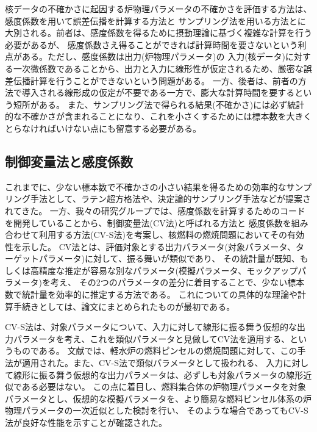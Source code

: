\documentclass[a4paper,11pt,titlepage,uplatex]{jsreport}
\begin{document}
核データの不確かさに起因する炉物理パラメータの不確かさを評価する方法は、感度係数を用いて誤差伝播を計算する方法\cite{cacucci1988forward}と
サンプリング法を用いる方法\cite{mckay1988sensitivity}とに大別される。前者は、感度係数を得るために摂動理論に基づく複雑な計算を行う必要があるが、
感度係数さえ得ることができれば計算時間を要さないという利点がある。ただし、感度係数は出力(炉物理パラメータ)の
入力(核データ)に対する一次微係数であることから、出力と入力に線形性が仮定されるため、厳密な誤差伝播計算を行うことができないという問題がある。
一方、後者は、前者の方法で導入される線形成の仮定が不要である一方で、膨大な計算時間を要するという短所がある。
また、サンプリング法で得られる結果(不確かさ)には必ず統計的な不確かさが含まれることになり、これを小さくするためには標本数を大きくとらなければいけない点にも留意する必要がある。

\subsection{制御変量法と感度係数}
これまでに、少ない標本数で不確かさの小さい結果を得るための効率的なサンプリング手法として、ラテン超方格法\cite{mckay1988sensitivity}や、決定論的サンプリング手法\cite{julier1997new}などが提案されてきた。
一方、我々の研究グループでは、感度係数を計算するためのコードを開発していることから、制御変量法(CV法)と呼ばれる方法と
感度係数を組み合わせて利用する方法(CV-S法)を考案し、核燃料の燃焼問題においてその有効性を示した\cite{nihira2019combination}。
CV法とは、評価対象とする出力パラメータ(対象パラメータ、ターゲットパラメータ)に対して、振る舞いが類似であり、
その統計量が既知、もしくは高精度な推定が容易な別なパラメータ(模擬パラメータ、モックアップパラメータ)を考え、
その2つのパラメータの差分に着目することで、少ない標本数で統計量を効率的に推定する方法である\cite{kroese2013handbook}。
これについての具体的な理論や計算手続きとしては、論文\cite{nihira2019combination}にまとめられたものが最初である。

CV-S法は、対象パラメータについて、入力に対して線形に振る舞う仮想的な出力パラメータを考え、これを類似パラメータと見做してCV法を適用する、というものである。
文献\cite{nihira2019combination}では、軽水炉の燃料ピンセルの燃焼問題に対して、この手法が適用された。また、CV-S法で類似パラメータとして扱われる、
入力に対して線形に振る舞う仮想的な出力パラメータは、必ずしも対象パラメータの線形近似である必要はない。
この点に着目し、燃料集合体の炉物理パラメータを対象パラメータとし、仮想的な模擬パラメータを、より簡易な燃料ピンセル体系の炉物理パラメータの一次近似とした検討を行い、
そのような場合であってもCV-S法が良好な性能を示すことが確認された\cite{kida2022enhancement}。
\end{document}
